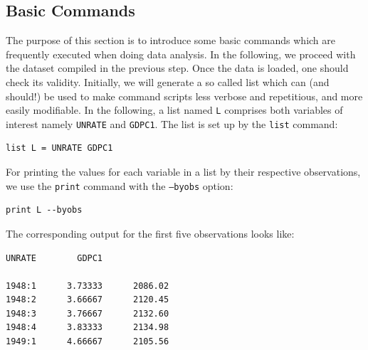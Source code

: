 \documentclass[11pt]{article}
\begin{document}


\subsection{Basic Commands}
The purpose of this section is to introduce some basic commands which are frequently executed when doing data analysis. In the following, we proceed with the dataset compiled in the previous step. Once the data is loaded, one should check its validity. %
Initially, we will generate a so called list which can (and should!) be used to make command scripts less verbose and repetitious, and more easily modifiable. In the following, a list named \texttt{L} comprises both variables of interest namely \texttt{UNRATE} and \texttt{GDPC1}. The list is set up by the \texttt{list} command:
\begin{Verbatim}[baselinestretch=0.75, fontsize=\small]
list L = UNRATE GDPC1
\end{Verbatim}

For printing the values for each variable in a list by their respective observations, we use the \texttt{print} command with the \texttt{---byobs} option:
\begin{Verbatim}[baselinestretch=0.75, fontsize=\small]
print L --byobs
\end{Verbatim}
The corresponding output for the first five observations looks like:
\begin{Verbatim}[baselinestretch=0.75, fontsize=\small]
             UNRATE        GDPC1

1948:1      3.73333      2086.02
1948:2      3.66667      2120.45
1948:3      3.76667      2132.60
1948:4      3.83333      2134.98
1949:1      4.66667      2105.56
\end{Verbatim}
\end{document}
